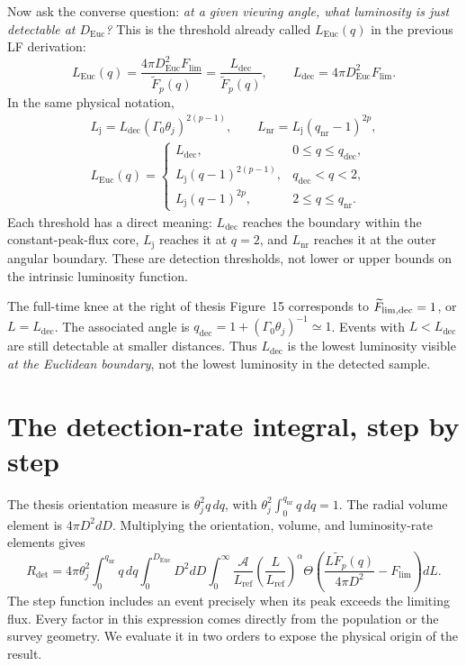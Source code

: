 \documentclass[11pt,a4paper]{article}
\newcommand{\Euc}{\mathrm{Euc}}
\newcommand{\dec}{\mathrm{dec}}
\newcommand{\nr}{\mathrm{nr}}
\newcommand{\Flim}{F_{\mathrm{lim}}}
\newcommand{\Lref}{L_{\mathrm{ref}}}
\newcommand{\Ldec}{L_{\mathrm{dec}}}
\newcommand{\Lj}{L_{\mathrm j}}
\newcommand{\Lnr}{L_{\mathrm{nr}}}
\newcommand{\Rdet}{R_{\mathrm{det}}}
\newcommand{\fp}{\widetilde F_p}
\begin{document}
Now ask the converse question: \emph{at a given viewing angle, what luminosity
is just detectable at $D_\Euc$?} This is the threshold already called
$L_\Euc(q)$ in the previous LF derivation:
\begin{equation}
 \boxed{L_\Euc(q)=\frac{4\pi D_\Euc^2\Flim}{\fp(q)}
 =\frac{\Ldec}{\fp(q)},\qquad
 \Ldec=4\pi D_\Euc^2\Flim.}
 \label{eq:LEuc}
\end{equation}
In the same physical notation,
\begin{gather}
 \Lj=\Ldec(\Gamma_0\theta_j)^{2(p-1)},\qquad
 \Lnr=\Lj(q_\nr-1)^{2p},
 \label{eq:LjLnr}\\
 L_\Euc(q)=\begin{cases}
 \Ldec,&0\le q\le q_\dec,\\
 \Lj(q-1)^{2(p-1)},&q_\dec<q<2,\\
 \Lj(q-1)^{2p},&2\le q\le q_\nr.
 \end{cases}
 \label{eq:threshold-branches}
\end{gather}
Each threshold has a direct meaning: $\Ldec$ reaches the boundary within
the constant-peak-flux core, $\Lj$ reaches it at $q=2$, and $\Lnr$ reaches
it at the outer angular boundary. These are detection thresholds, not lower
or upper bounds on the intrinsic luminosity function.

The full-time knee at the right of thesis Figure~15 corresponds to
$\widetilde F_{\rm lim,dec}=1$, or $L=\Ldec$.
The associated angle is $q_\dec=1+(\Gamma_0\theta_j)^{-1}\simeq1$.
Events with $L<\Ldec$ are still detectable at smaller distances. Thus
$\Ldec$ is the lowest luminosity visible \emph{at the Euclidean boundary},
not the lowest luminosity in the detected sample.

\section{The detection-rate integral, step by step}
\label{sec:rate}
The thesis orientation measure is $\theta_j^2q\,dq$, with
$\theta_j^2\int_0^{q_\nr}q\,dq=1$.
The radial volume element is $4\pi D^2dD$. Multiplying the orientation,
volume, and luminosity-rate elements gives
\begin{equation}
 \Rdet=4\pi\theta_j^2\int_0^{q_\nr}q\,dq
 \int_0^{D_\Euc}D^2dD\int_0^\infty
 \frac{\mathcal A}{\Lref}\left(\frac L{\Lref}\right)^\alpha
 \Theta\!\left(\frac{L\fp(q)}{4\pi D^2}-\Flim\right)dL.
 \label{eq:triple}
\end{equation}
The step function includes an event precisely when its peak exceeds the
limiting flux. Every factor in this expression comes directly from the
population or the survey geometry. We evaluate it in two orders to expose
the physical origin of the result.
\end{document}
